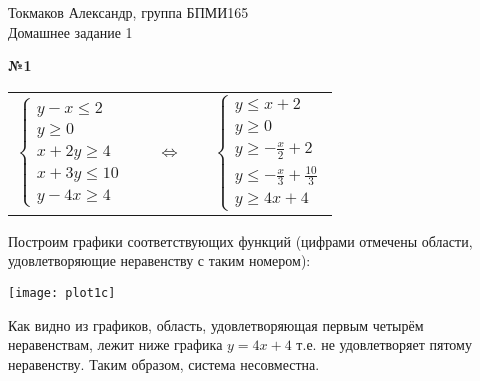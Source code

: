 \documentclass{article}
\newenvironment{task}{\begin{center}\fontsize{14}{14}\selectfont\bf}{\rm\fontsize{12}{12}\selectfont\end{center}}
\begin{document}
	\begin{center}
		Токмаков Александр, группа БПМИ165 \\
		Домашнее задание 1
	\end{center}
	
	\begin{task} 
		№1
	\end{task}
	\begin{center}
	\begin{tabular}{ccc}
		$ \begin{cases}
		y-x\leq 2 \\
		y \geq 0 \\
		x+2y \geq 4 \\
		x+3y \leq 10 \\
		y-4x \geq 4
		\end{cases} $
		& $\quad \Leftrightarrow \quad$ &
		$ \begin{cases}
		y \leq x+2 \\
		y \geq 0 \\
		y \geq - \frac{x}{2} + 2 \\
		y \leq - \frac{x}{3} + \frac{10}{3} \\
		y \geq 4x+4
		\end{cases} $
	\end{tabular}
	\end{center}
	Построим графики соответствующих функций (цифрами отмечены области, удовлетворяющие неравенству с таким номером):\\
	\begin{center} \texttt{[image: plot1c]} \end{center}
	Как видно из графиков, область, удовлетворяющая первым четырём неравенствам, лежит ниже графика $y=4x+4$ т.е. не удовлетворяет пятому неравенству. Таким образом, система несовместна.\\

\end{document}

